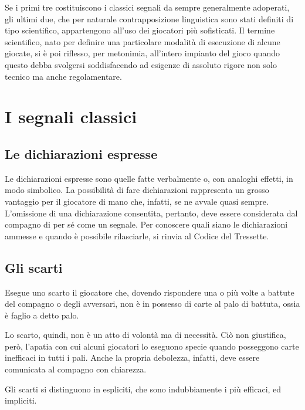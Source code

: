 \documentclass[italian,a4paper]{article}
\begin{document}
Se i primi tre costituiscono i classici segnali da sempre generalmente adoperati, gli ultimi due, che per naturale contrapposizione linguistica sono stati definiti di tipo scientifico, appartengono all'uso dei giocatori più sofisticati.
Il termine scientifico, nato per definire una particolare modalità di esecuzione di alcune giocate, si è poi riflesso, per metonimia, all'intero impianto del gioco quando questo debba svolgersi soddisfacendo ad esigenze di assoluto rigore non solo tecnico ma anche regolamentare.
\section{I segnali classici}
\subsection{Le dichiarazioni espresse}
Le dichiarazioni espresse sono quelle fatte verbalmente o, con analoghi effetti, in modo simbolico.
La possibilità di fare dichiarazioni rappresenta un grosso vantaggio per il giocatore di mano che, infatti, se ne avvale quasi sempre.
L'omissione di una dichiarazione consentita, pertanto, deve essere considerata dal compagno di per sé come un segnale.
Per conoscere quali siano le dichiarazioni ammesse e quando è possibile rilasciarle, si rinvia al Codice del Tressette.
\subsection{Gli scarti}
Esegue uno scarto il giocatore che, dovendo rispondere una o più volte a battute del compagno o degli avversari, non è in possesso di carte al palo di battuta, ossia è faglio a detto palo.
 
Lo scarto, quindi, non è un atto di volontà ma di necessità. Ciò non giustifica, però, l'apatia con cui alcuni giocatori lo eseguono specie quando posseggono carte inefficaci in tutti i pali. Anche la propria debolezza, infatti, deve essere comunicata al compagno con chiarezza.
 
Gli scarti si distinguono in espliciti, che sono indubbiamente i più efficaci, ed impliciti.
\end{document}
